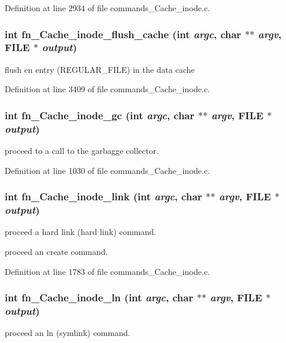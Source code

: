 Definition at line 2934 of file commands\_\-Cache\_\-inode.c.
\subsubsection[{fn\_\-Cache\_\-inode\_\-flush\_\-cache}]{\setlength{\rightskip}{0pt plus 5cm}int fn\_\-Cache\_\-inode\_\-flush\_\-cache (int {\em argc}, \/  char $\ast$$\ast$ {\em argv}, \/  FILE $\ast$ {\em output})}\label{commands_8h_a096579b40ab0979f63b478dca8872192}
flush en entry (REGULAR\_\-FILE) in the data cache 

Definition at line 3409 of file commands\_\-Cache\_\-inode.c.
\subsubsection[{fn\_\-Cache\_\-inode\_\-gc}]{\setlength{\rightskip}{0pt plus 5cm}int fn\_\-Cache\_\-inode\_\-gc (int {\em argc}, \/  char $\ast$$\ast$ {\em argv}, \/  FILE $\ast$ {\em output})}\label{commands_8h_af9e30aa72007966403bac9988d4eed5b}
proceed to a call to the garbagge collector. 

Definition at line 1030 of file commands\_\-Cache\_\-inode.c.
\subsubsection[{fn\_\-Cache\_\-inode\_\-link}]{\setlength{\rightskip}{0pt plus 5cm}int fn\_\-Cache\_\-inode\_\-link (int {\em argc}, \/  char $\ast$$\ast$ {\em argv}, \/  FILE $\ast$ {\em output})}\label{commands_8h_a29e45dc95b214393d1c59b7816f9e72d}
proceed a hard link (hard link) command.

proceed an create command. 

Definition at line 1783 of file commands\_\-Cache\_\-inode.c.
\subsubsection[{fn\_\-Cache\_\-inode\_\-ln}]{\setlength{\rightskip}{0pt plus 5cm}int fn\_\-Cache\_\-inode\_\-ln (int {\em argc}, \/  char $\ast$$\ast$ {\em argv}, \/  FILE $\ast$ {\em output})}\label{commands_8h_ada1665ad0f6c599f444cecdfe3781260}
proceed an ln (symlink) command. 

